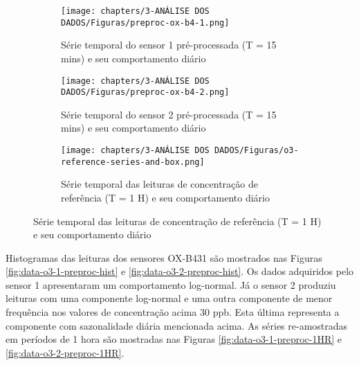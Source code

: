 \begin{figure}[h]
    \centering
    \caption{Séries temporais dos sensores OX-B431 pré-processadas}
    \begin{subfigure}{0.95\textwidth}
        \texttt{[image: chapters/3-ANÁLISE DOS DADOS/Figuras/preproc-ox-b4-1.png]}
        \caption{Série temporal do sensor 1 pré-processada (T = 15 mins) e seu comportamento diário}
        \label{fig:data-o3-1-preproc-15}
    \end{subfigure}
    \begin{subfigure}{0.95\textwidth}
        \texttt{[image: chapters/3-ANÁLISE DOS DADOS/Figuras/preproc-ox-b4-2.png]}
        \caption{Série temporal do sensor 2 pré-processada (T = 15 mins) e seu comportamento diário}
        \label{fig:data-o3-2-preproc-15}
    \end{subfigure}
    \label{fig:data-o3-preproc-15}
    \begin{subfigure}{0.95\textwidth}
        \texttt{[image: chapters/3-ANÁLISE DOS DADOS/Figuras/o3-reference-series-and-box.png]}
        \caption{Série temporal das leituras de concentração de referência (T = 1 H) e seu comportamento diário}
        \label{fig:data-o3-reference}
    \end{subfigure}
    \label{fig:data-o3-preproc-15}
\end{figure}

Histogramas das leituras dos sensores OX-B431 são mostrados nas Figuras \ref{fig:data-o3-1-preproc-hist} e \ref{fig:data-o3-2-preproc-hist}. Os dados adquiridos pelo sensor 1 apresentaram um comportamento log-normal. Já o sensor 2 produziu leituras com uma componente log-normal e uma outra componente de menor frequência nos valores de concentração acima 30 ppb. Esta última representa a componente com sazonalidade diária mencionada acima. As séries re-amostradas em períodos de 1 hora são mostradas nas Figuras \ref{fig:data-o3-1-preproc-1HR} e \ref{fig:data-o3-2-preproc-1HR}.


